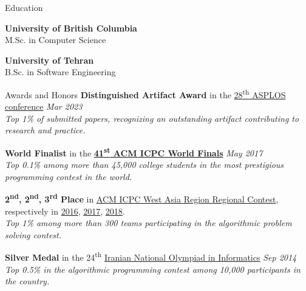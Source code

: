 \documentclass[
	10pt, %
]{resume} %
\begin{document}

\begin{rSection}{Education}
	
  \textbf{University of British Columbia} \\ %
	M.Sc. in Computer Science

  \textbf{University of Tehran} \\ %
  B.Sc. in Software Engineering
\end{rSection}


\begin{rSection}{Awards and Honors}
  {\bf Distinguished Artifact Award} in the
  \href{https://asplos-conference.org/asplos2023/index.html}{28\textsuperscript{th} ASPLOS conference} \hfill \textit{Mar 2023}
  \\ \textit{Top 1\% of submitted papers, recognizing an outstanding artifact contributing to research and practice.}


	\item {\bf World Finalist} in the
    \href{https://icpc.global/community/results-2017}{\textbf{41\textsuperscript{st} ACM ICPC World Finals}} \hfill \textit{May 2017}
  \\ \textit{Top 0.1\% among more than 45,000 college students in the most prestigious programming contest in the world.}

	{\bf 2\textsuperscript{nd}, 2\textsuperscript{nd}, 3\textsuperscript{rd} Place} in 
      \href{https://icpc.ir/}{ACM ICPC West Asia Region Regional Contest}, respectively in
      \href{http://icpc.sharif.edu/acmicpc16/scoreboard/}{2016},
      \href{http://icpc.sharif.edu/acmicpc17/scoreboard/}{2017},
      \href{http://icpc.sharif.edu/acmicpc18/scoreboard/}{2018}.
	\\ \textit{Top 1\% among more than 300 teams participating in the algorithmic
        problem solving contest.}

	{\bf Silver Medal} in the 24\textsuperscript{th} \href{http://inoi.ir/}
  {Iranian National Olympiad in Informatics} \hfill \textit{Sep 2014}
	\\ \textit{Top 0.5\% in the algorithmic programming contest among 10,000 participants in the country.}

\end{rSection}
\end{document}
